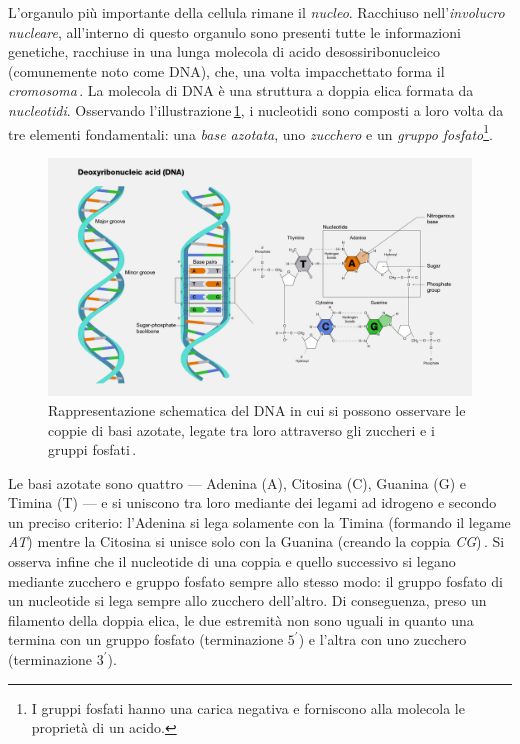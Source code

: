 L'organulo più importante della cellula rimane il \textsl{nucleo}. Racchiuso nell'\textsl{involucro nucleare}, all'interno di questo organulo sono presenti tutte le informazioni genetiche, racchiuse in una lunga molecola di acido desossiribonucleico (comunemente noto come DNA), che, una volta impacchettato forma il \textsl{cromosoma}\,\cite{pollard2022cell, alberts2015essential}. La molecola di DNA è una struttura a doppia elica formata da \textsl{nucleotidi}. Osservando l'illustrazione\,\ref{fig:dna}, i nucleotidi sono composti a loro volta da tre elementi fondamentali: una \textsl{base azotata}, uno \textsl{zucchero} e un \textsl{gruppo fosfato}\footnote{I gruppi fosfati hanno una carica negativa e forniscono alla molecola le proprietà di un acido.}.
% 
\begin{figure}[b!]
    \centering
    \includegraphics[width=\textwidth]{assets/dna2.jpg}
    \caption[Rappresentazione schematica del DNA.]{Rappresentazione schematica del DNA in cui si possono osservare le coppie di basi azotate, legate tra loro attraverso gli zuccheri e i gruppi fosfati\,\cite{nhgri_dna_image}.}\label{fig:dna}
\end{figure}
% 
Le basi azotate sono quattro — Adenina (A), Citosina (C), Guanina (G) e Timina (T) — e si uniscono tra loro mediante dei legami ad idrogeno e secondo un preciso criterio: l'Adenina si lega solamente con la Timina (formando il legame \textit{AT}) mentre la Citosina si unisce solo con la Guanina (creando la coppia \textit{CG})\,\cite{fonseca2000hydrogen, sahu2011identification}. Si osserva infine che il nucleotide di una coppia e quello successivo si legano mediante zucchero e gruppo fosfato sempre allo stesso modo: il gruppo fosfato di un nucleotide si lega sempre allo zucchero dell'altro. Di conseguenza, preso un filamento della doppia elica, le due estremità non sono uguali in quanto una termina con un gruppo fosfato (terminazione $5^\prime$) e l'altra con uno zucchero (terminazione $3^\prime$).

